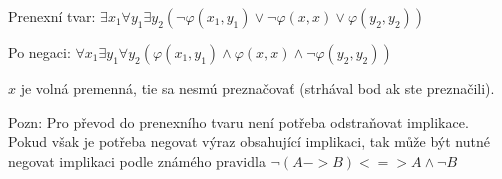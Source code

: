 Prenexní tvar: $\exists x_1 \forall y_1 \exists y_2 ( \neg \varphi (x_1,y_1) \vee  \neg \varphi (x,x) \vee \varphi (y_2,y_2))$

Po negaci: $\forall x_1 \exists y_1 \forall y_2 ( \varphi (x_1,y_1) \wedge  \varphi (x,x) \wedge \neg \varphi (y_2,y_2))$

$x$ je volná premenná, tie sa nesmú preznačovať (strhával bod ak ste preznačili).

Pozn: Pro převod do prenexního tvaru není potřeba odstraňovat implikace. Pokud však je potřeba negovat výraz obsahující implikaci, tak může být nutné negovat implikaci podle známého pravidla  $\neg (A->B) <=> A \wedge \neg B$

